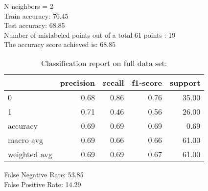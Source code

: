 N neighbors = 2\\
Train accuracy: 76.45%
\\Test accuracy: 68.85%
\\Number of mislabeled points out of a total 61 points : 19
\\The accuracy score achieved is: 68.85 %
\begin{table}[H]
\caption{Classification report on full data set:}
\begin{center}
\begin{tabular}{lrrrr}
\toprule
{} &  precision &  recall &  f1-score &  support \\
\midrule
0            &       0.68 &    0.86 &      0.76 &    35.00 \\
1            &       0.71 &    0.46 &      0.56 &    26.00 \\
accuracy     &       0.69 &    0.69 &      0.69 &     0.69 \\
macro avg    &       0.69 &    0.66 &      0.66 &    61.00 \\
weighted avg &       0.69 &    0.69 &      0.67 &    61.00 \\
\bottomrule
\end{tabular}

\label{k_nearest_neighbors_class}
\end{center}
\end{table}
\noindent
False Negative Rate: 53.85
\\False Positive Rate: 14.29
